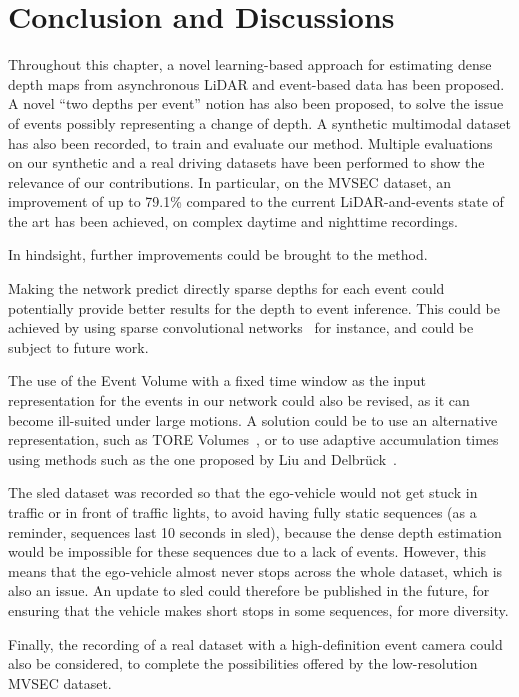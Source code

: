 \section{Conclusion and Discussions}\label{sec:aled:conclusion}
Throughout this chapter, a novel learning-based approach for estimating dense depth maps from asynchronous LiDAR and event-based data has been proposed. A novel ``two depths per event'' notion has also been proposed, to solve the issue of events possibly representing a change of depth. A synthetic multimodal dataset has also been recorded, to train and evaluate our method. Multiple evaluations on our synthetic and a real driving datasets have been performed to show the relevance of our contributions. In particular, on the MVSEC dataset, an improvement of up to 79.1\% compared to the current LiDAR-and-events state of the art has been achieved, on complex daytime and nighttime recordings.

In hindsight, further improvements could be brought to the method.
\begin{enumerate*}[label=\textbf{(\arabic*)}]
  \item Making the network predict directly sparse depths for each event could potentially provide better results for the depth to event inference. This could be achieved by using sparse convolutional networks~\cite{Messikommer2020EventbasedAS} for instance, and could be subject to future work.
  \item The use of the Event Volume with a fixed time window as the input representation for the events in our network could also be revised, as it can become ill-suited under large motions. A solution could be to use an alternative representation, such as TORE Volumes~\cite{Baldwin2021TimeOrderedRE}, or to use adaptive accumulation times using methods such as the one proposed by Liu and Delbrück~\cite{Liu2018AdaptiveTB}.
  \item The \acrshort{sled} dataset was recorded so that the ego-vehicle would not get stuck in traffic or in front of traffic lights, to avoid having fully static sequences (as a reminder, sequences last 10 seconds in \acrshort{sled}), because the dense depth estimation would be impossible for these sequences due to a lack of events. However, this means that the ego-vehicle almost never stops across the whole dataset, which is also an issue. An update to \acrshort{sled} could therefore be published in the future, for ensuring that the vehicle makes short stops in some sequences, for more diversity.
  \item Finally, the recording of a real dataset with a high-definition event camera could also be considered, to complete the possibilities offered by the low-resolution MVSEC dataset.
\end{enumerate*}

